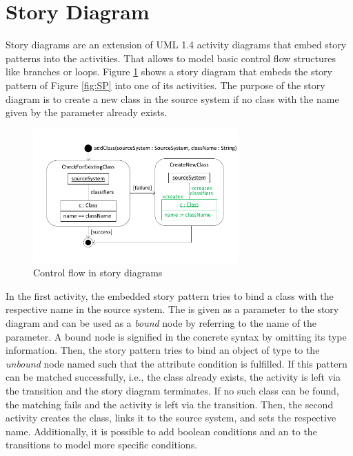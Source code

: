 \section{Story Diagram} \label{sec:StoryDiagrams}

Story diagrams are an extension of UML 1.4 activity diagrams \cite{UML} that embed story patterns into the activities.
That allows to model basic control flow structures like branches or loops.
Figure \ref{fig:controlFlow} shows a story diagram that embeds the story pattern of Figure \ref{fig:SP} into one of its activities.
The purpose of the story diagram is to create a new class in the source system if no class with the name given by the parameter  already exists. 

\begin{figure}[tbp]
\begin{center}
  \includegraphics[width=0.7\textwidth]{figures/ControlFlow}
  \caption{Control flow in story diagrams}
  \label{fig:controlFlow}
\end{center}
\end{figure}

In the first activity, the embedded story pattern tries to bind a class with the respective name in the source system. The  is given as a parameter to the story diagram and can be used as a \emph{bound} node by referring to the name of the parameter. A bound node is signified in the concrete syntax by omitting its type information. Then, the story pattern tries to bind an object of type  to the \emph{unbound} node named  such that the attribute condition is fulfilled. 
If this pattern can be matched successfully, i.e., the class already exists, the activity is left via the \fe{[success]} transition and the story diagram terminates.
If no such class can be found, the matching fails and the activity is left via the \fe{[failure]} transition.
Then, the second activity creates the class, links it to the source system, and sets the respective name. 
Additionally, it is possible to add boolean conditions and an \fe{[else]} to the transitions to model more specific conditions.

